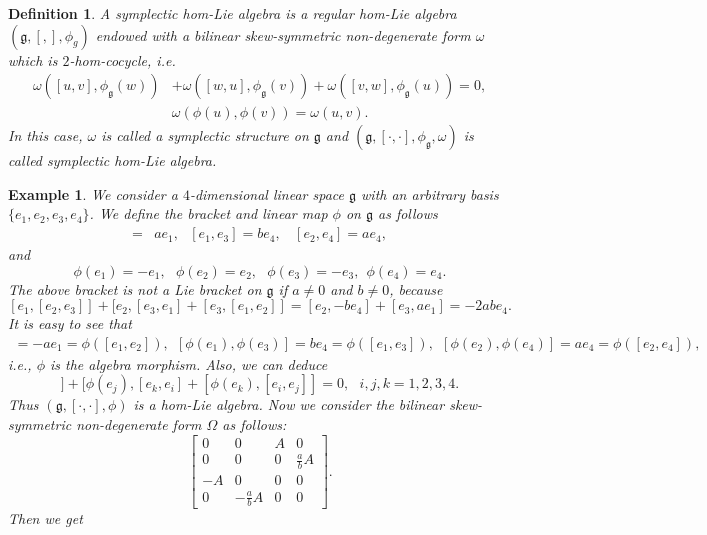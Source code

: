 \documentclass[10pt]{amsart}
\numberwithin{equation}{section}
\newtheorem{definition}[theorem]{Definition}
\newtheorem{example}[theorem]{Example}
\begin{document}
\begin{definition}
A symplectic hom-Lie algebra is a regular hom-Lie algebra $(\mathfrak{g}, [,],\phi_{g})$ endowed with a bilinear skew-symmetric
non-degenerate form $\omega$ which is $2$-hom-cocycle, i.e.
\begin{align*}
 \omega([u, v], { \phi_\mathfrak{g}}(w)) &+ \omega([w,u],{ \phi_\mathfrak{g}}( v)) + \omega([v,w],{ \phi_\mathfrak{g}}( u))=0,\\
&\omega(\phi(u),\phi(v))=\omega(u,v).
\end{align*}
In this case, $\omega$ is called a symplectic structure on $\mathfrak{g}$ and $(\mathfrak{g}, [\cdot, \cdot], \phi_\mathfrak{g}, \omega)$ is called symplectic hom-Lie algebra.
\end{definition}
\begin{example}\label{IMEX}
We consider a $4$-dimensional linear space $\mathfrak{g}$ with an arbitrary basis $\{e_1,e_2,e_3,e_4\}$. We define the bracket
and linear map $\phi$ on $\mathfrak{g}$ as follows 
\begin{align*}
[e_1,e_2]=&ae_1,\ \ \ [e_1,e_3]=be_4,\ \ \ \ [e_2,e_4]=a e_4,
\end{align*}
and
\[
\phi(e_1)=-e_1,\ \ \ \phi(e_2)=e_2,\ \ \ \phi(e_3)=-e_3, \ \ \phi(e_4)=e_4.
\]
The above bracket is not a Lie bracket on $\mathfrak{g}$ if $a\neq 0$ and $b\neq0$, because
\[
[e_1,[e_2,e_3]]+[e_2,[e_3,e_1]+[e_3,[e_1,e_2]]=[e_2,-be_4]+[e_3,ae_1]=-2abe_4.
\]
It is easy to see that 
\begin{align*}
[\phi(e_1),\phi(e_2)]=-ae_1=\phi([e_1, e_2]),\ \ [\phi(e_1),\phi(e_3)]=be_4=\phi([e_1, e_3]),\ \ [\phi(e_2),\phi(e_4)]=a e_4=\phi([e_2, e_4]),
\end{align*}
i.e., $\phi$ is the algebra morphism. Also, we can deduce 
\begin{equation*}
[\phi(e_i),[e_j,e_k]]+[\phi(e_j),[e_k,e_i]+[\phi(e_k),[e_i,e_j]]=0,\ \ \ i,j,k=1, 2, 3, 4.
\end{equation*}
Thus $(\mathfrak{g}, [\cdot,\cdot], \phi)$ is a hom-Lie algebra. Now we consider the bilinear skew-symmetric
non-degenerate form $\Omega$ as follows:
\begin{equation}
\begin{bmatrix}
0&0&A&0\\
0&0&0&\frac{a}{b}A\\
-A&0&0&0\\
0&-\frac{a}{b}A&0&0
\end{bmatrix}
.
\end{equation}
Then we get
\begin{align*}

\end{align*}
\end{example}
\end{document}

